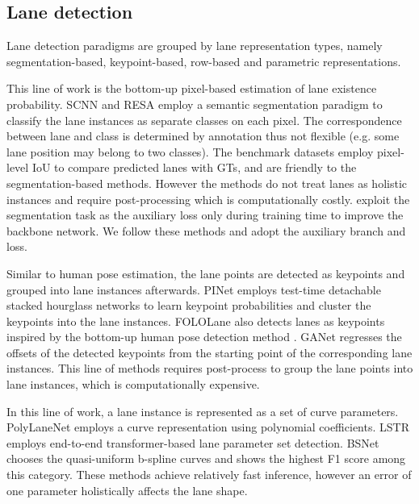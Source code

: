 \documentclass[10pt,twocolumn,letterpaper]{article}
\begin{document}
\subsection{Lane detection}
Lane detection paradigms are grouped by lane representation types, namely segmentation-based, keypoint-based, row-based and parametric representations.

  This line of work is the bottom-up pixel-based estimation of lane existence probability.
SCNN \cite{pan2018SCNN} and RESA \cite{RESA_2021} employ a semantic segmentation paradigm to classify the lane instances as separate classes on each pixel.
The correspondence between lane and class is determined by annotation thus not flexible (e.g. some lane position may belong to two classes). 
The benchmark datasets \cite{pan2018SCNN, CurveLane-NAS} employ pixel-level IoU to compare predicted lanes with GTs, and are friendly to the segmentation-based methods.
However the methods do not treat lanes as holistic instances and require post-processing which is computationally costly.
\cite{qin2020ultra, Zheng_2022_CVPR} exploit the segmentation task as the auxiliary loss only during training time to improve the backbone network. We follow these methods and adopt the auxiliary branch and loss.

 Similar to human pose estimation, the lane points are detected as keypoints and grouped into lane instances afterwards.
PINet \cite{pinet} employs test-time detachable stacked hourglass networks to learn keypoint probabilities and cluster the keypoints into the lane instances. 
FOLOLane \cite{Qu_2021_CVPR} also detects lanes as keypoints inspired by the bottom-up human pose detection method \cite{openpose}.
GANet \cite{ganet-cvpr2022} regresses the offsets of the detected keypoints from the starting point of the corresponding lane instances.
This line of methods requires post-process to group the lane points into lane instances, which is computationally expensive.

 In this line of work, a lane instance is represented as a set of curve parameters. 
PolyLaneNet \cite{TorresBPBSO20} employs a curve representation using polynomial coefficients.
LSTR \cite{LSTR} employs end-to-end transformer-based lane parameter set detection.
BSNet \cite{BSNet} chooses the quasi-uniform b-spline curves and shows the highest F1 score among this category.
These methods achieve relatively fast inference, however an error of one parameter holistically affects the lane shape.
\end{document}
